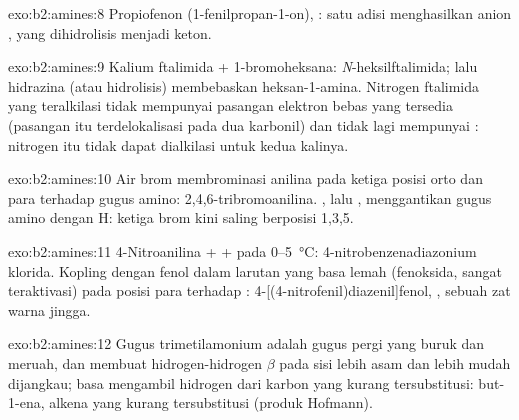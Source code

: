 \begin{solution}{exo:b2:amines:8}
Propiofenon (1-fenilpropan-1-on), : satu adisi menghasilkan
anion , yang dihidrolisis menjadi keton.
\end{solution}

\begin{solution}{exo:b2:amines:9}
Kalium ftalimida + 1-bromoheksana: \textit{N}-heksilftalimida; lalu hidrazina
(atau hidrolisis) membebaskan heksan-1-amina. Nitrogen ftalimida yang
teralkilasi tidak mempunyai pasangan elektron bebas yang tersedia (pasangan
itu terdelokalisasi pada dua karbonil) dan tidak lagi mempunyai :
nitrogen itu tidak dapat dialkilasi untuk kedua kalinya.
\end{solution}

\begin{solution}{exo:b2:amines:10}
Air brom membrominasi anilina pada ketiga posisi orto dan para terhadap
gugus amino: 2,4,6-tribromoanilina. , lalu , menggantikan
gugus amino dengan H: ketiga brom kini saling berposisi 1,3,5.
\end{solution}

\begin{solution}{exo:b2:amines:11}
4-Nitroanilina +  +  pada 0--\qty{5}{\degreeCelsius}:
4-nitrobenzenadiazonium klorida. Kopling dengan fenol dalam larutan yang
basa lemah (fenoksida, sangat teraktivasi) pada posisi para terhadap
: 4-[(4-nitrofenil)diazenil]fenol, , sebuah
zat warna jingga.
\end{solution}

\begin{solution}{exo:b2:amines:12}
Gugus trimetilamonium adalah gugus pergi yang buruk dan meruah, dan membuat
hidrogen-hidrogen $\beta$ pada sisi  lebih asam dan lebih mudah
dijangkau; basa mengambil hidrogen dari karbon yang kurang tersubstitusi:
but-1-ena, alkena yang kurang tersubstitusi (produk Hofmann).
\end{solution}

